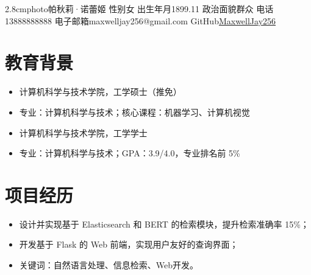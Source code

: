 \documentclass[watermark=true]{hitresume}
\begin{document}
\begin{personalinfo}
    {2.8cm}{photo}{帕秋莉·诺蕾姬} %
    {性别}{女}
    {出生年月}{1899.11}
    {政治面貌}{群众}
    {电话}{13888888888}
    {电子邮箱}{maxwelljay256@gmail.com}
    {GitHub}{\href{https://github.com/MaxwellJay256}{MaxwellJay256}}
\end{personalinfo}


\section{教育背景}
\begin{itemize}
    \item 计算机科学与技术学院，工学硕士（推免）
    \item 专业：计算机科学与技术；核心课程：机器学习、计算机视觉
\end{itemize}
\begin{itemize}
    \item 计算机科学与技术学院，工学学士
    \item 专业：计算机科学与技术；GPA：3.9/4.0，专业排名前 5\%
\end{itemize}

\section{项目经历}
\begin{itemize}
    \item 设计并实现基于 \textcolor{HITBlueAux2}{Elasticsearch} 和 BERT 的检索模块，提升检索准确率 15\%；
    \item 开发基于 Flask 的 Web 前端，实现用户友好的查询界面；
    \item 关键词：自然语言处理、信息检索、Web开发。
\end{itemize}
\end{document}
